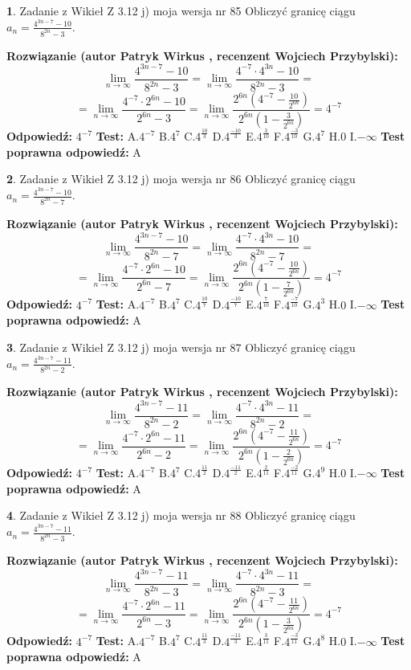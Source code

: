 \documentclass[12pt, a4paper]{article}
\theoremstyle{definition} %
\newtheorem{zad}{}
\newcommand{\zadStart}[1]{\begin{zad}#1\newline}
\newcommand{\zadStop}{\end{zad}}
\newcommand{\rozwStart}[2]{\noindent \textbf{Rozwiązanie (autor #1 , recenzent #2): }\newline}
\newcommand{\rozwStop}{\newline}
\newcommand{\odpStart}{\noindent \textbf{Odpowiedź:}\newline}
\newcommand{\odpStop}{\newline}
\newcommand{\testStart}{\noindent \textbf{Test:}\newline}
\newcommand{\testStop}{\newline}
\newcommand{\kluczStart}{\noindent \textbf{Test poprawna odpowiedź:}\newline}
\newcommand{\kluczStop}{\newline}
\begin{document}
\zadStart{Zadanie z Wikieł Z 3.12 j) moja wersja nr 85}
Obliczyć granicę ciągu $a_{n}=\frac{4^{3n-7}-10}{8^{2n}-3}$.
\zadStop
\rozwStart{Patryk Wirkus}{Wojciech Przybylski}
$$\lim\limits_{n\to\infty}\frac{4^{3n-7}-10}{8^{2n}-3}= \lim\limits_{n\to\infty}\frac{4^{-7} \cdot 4^{3n}-10}{8^{2n}-3}=$$
$$= \lim\limits_{n\to\infty}\frac{4^{-7} \cdot 2^{6n}-10}{2^{6n}-3}= \lim\limits_{n\to\infty}\frac{2^{6n}(4^{-7} - \frac{10}{2^{6n}})}{2^{6n}(1-\frac{3}{2^{6n}})}= 4^{-7}$$
\rozwStop
\odpStart
$4^{-7}$
\odpStop
\testStart
A.$4^{-7}$
B.$4^{7}$
C.$4^{\frac{10}{3}}$
D.$4^{\frac{-10}{3}}$
E.$4^{\frac{3}{10}}$
F.$4^{\frac{-3}{10}}$
G.$4^{7}$
H.$0$
I.$-\infty$
\testStop
\kluczStart
A
\kluczStop



\zadStart{Zadanie z Wikieł Z 3.12 j) moja wersja nr 86}
Obliczyć granicę ciągu $a_{n}=\frac{4^{3n-7}-10}{8^{2n}-7}$.
\zadStop
\rozwStart{Patryk Wirkus}{Wojciech Przybylski}
$$\lim\limits_{n\to\infty}\frac{4^{3n-7}-10}{8^{2n}-7}= \lim\limits_{n\to\infty}\frac{4^{-7} \cdot 4^{3n}-10}{8^{2n}-7}=$$
$$= \lim\limits_{n\to\infty}\frac{4^{-7} \cdot 2^{6n}-10}{2^{6n}-7}= \lim\limits_{n\to\infty}\frac{2^{6n}(4^{-7} - \frac{10}{2^{6n}})}{2^{6n}(1-\frac{7}{2^{6n}})}= 4^{-7}$$
\rozwStop
\odpStart
$4^{-7}$
\odpStop
\testStart
A.$4^{-7}$
B.$4^{7}$
C.$4^{\frac{10}{7}}$
D.$4^{\frac{-10}{7}}$
E.$4^{\frac{7}{10}}$
F.$4^{\frac{-7}{10}}$
G.$4^{3}$
H.$0$
I.$-\infty$
\testStop
\kluczStart
A
\kluczStop



\zadStart{Zadanie z Wikieł Z 3.12 j) moja wersja nr 87}
Obliczyć granicę ciągu $a_{n}=\frac{4^{3n-7}-11}{8^{2n}-2}$.
\zadStop
\rozwStart{Patryk Wirkus}{Wojciech Przybylski}
$$\lim\limits_{n\to\infty}\frac{4^{3n-7}-11}{8^{2n}-2}= \lim\limits_{n\to\infty}\frac{4^{-7} \cdot 4^{3n}-11}{8^{2n}-2}=$$
$$= \lim\limits_{n\to\infty}\frac{4^{-7} \cdot 2^{6n}-11}{2^{6n}-2}= \lim\limits_{n\to\infty}\frac{2^{6n}(4^{-7} - \frac{11}{2^{6n}})}{2^{6n}(1-\frac{2}{2^{6n}})}= 4^{-7}$$
\rozwStop
\odpStart
$4^{-7}$
\odpStop
\testStart
A.$4^{-7}$
B.$4^{7}$
C.$4^{\frac{11}{2}}$
D.$4^{\frac{-11}{2}}$
E.$4^{\frac{2}{11}}$
F.$4^{\frac{-2}{11}}$
G.$4^{9}$
H.$0$
I.$-\infty$
\testStop
\kluczStart
A
\kluczStop



\zadStart{Zadanie z Wikieł Z 3.12 j) moja wersja nr 88}
Obliczyć granicę ciągu $a_{n}=\frac{4^{3n-7}-11}{8^{2n}-3}$.
\zadStop
\rozwStart{Patryk Wirkus}{Wojciech Przybylski}
$$\lim\limits_{n\to\infty}\frac{4^{3n-7}-11}{8^{2n}-3}= \lim\limits_{n\to\infty}\frac{4^{-7} \cdot 4^{3n}-11}{8^{2n}-3}=$$
$$= \lim\limits_{n\to\infty}\frac{4^{-7} \cdot 2^{6n}-11}{2^{6n}-3}= \lim\limits_{n\to\infty}\frac{2^{6n}(4^{-7} - \frac{11}{2^{6n}})}{2^{6n}(1-\frac{3}{2^{6n}})}= 4^{-7}$$
\rozwStop
\odpStart
$4^{-7}$
\odpStop
\testStart
A.$4^{-7}$
B.$4^{7}$
C.$4^{\frac{11}{3}}$
D.$4^{\frac{-11}{3}}$
E.$4^{\frac{3}{11}}$
F.$4^{\frac{-3}{11}}$
G.$4^{8}$
H.$0$
I.$-\infty$
\testStop
\kluczStart
A
\kluczStop
\end{document}
